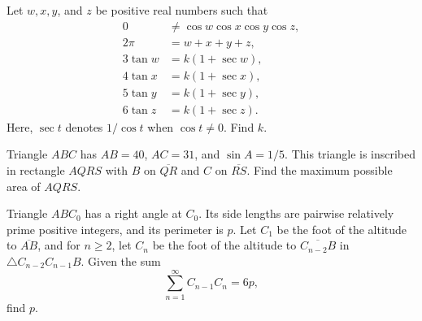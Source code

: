 \begin{question}[name={2015 HMMT, Guts, Problem 28}]
	Let $w,x,y$, and $z$ be positive real numbers such that
	\begin{align*}
		0 &\neq \cos w \cos x \cos y \cos z,\\
		2\pi &= w+x+y+z,\\
		3\tan w &= k(1+\sec w),\\
		4\tan x &= k(1+\sec x),\\
		5\tan y &= k(1+\sec y),\\
		6\tan z &= k(1+\sec z).
	\end{align*}
	Here, $\sec t$ denotes $1/\cos t$ when $\cos t \neq 0$. Find $k$.
\end{question}


%	









\begin{question}[name={2016 AIME I, \href{https://artofproblemsolving.com/community/c4p5966182}{Problem 9}}]
	Triangle $ABC$ has $AB = 40$, $AC = 31$, and $\sin A = 1/5$. This triangle is inscribed in rectangle $AQRS$ with $B$ on $\overline{QR}$ and $C$ on $\overline{RS}$. Find the maximum possible area of $AQRS$.
\end{question}


%	
















\begin{question}[name={2016 AIME II, \href{https://artofproblemsolving.com/community/c4p6023543}{Problem 5}}]
	Triangle $ABC_0$ has a right angle at $C_0$. Its side lengths are pairwise relatively prime positive integers, and its perimeter is $p$. Let $C_1$ be the foot of the altitude to $\overline{AB}$, and for $n\geq 2$, let $C_n$ be the foot of the altitude to $\overline{C_{n-2}B}$ in $\triangle C_{n-2}C_{n-1}B$. Given the sum $$\sum\limits_{n=1}^{\infty}C_{n-1}C_n = 6p,$$ find $p$.
\end{question}


